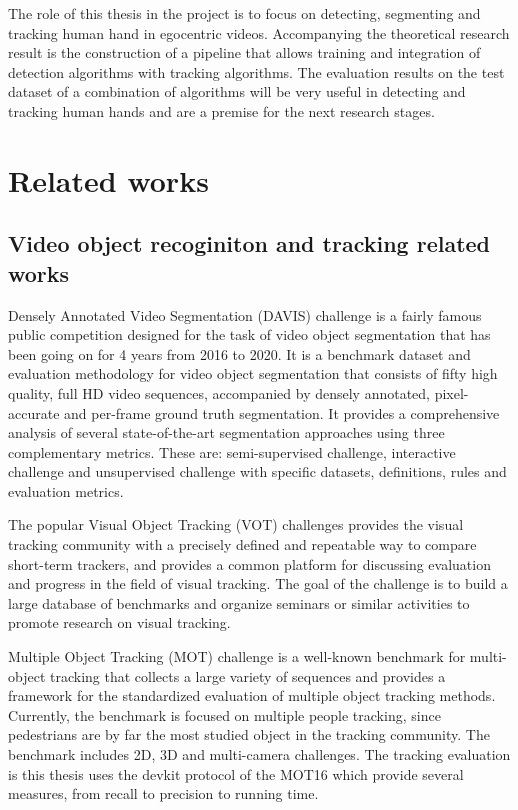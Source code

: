 The role of this thesis in the project is to focus on detecting, segmenting and tracking human hand in egocentric videos. Accompanying the theoretical research result is the construction of a pipeline that allows training and integration of detection algorithms with tracking algorithms. The evaluation results on the test dataset of a combination of algorithms will be very useful in detecting and tracking human hands and are a premise for the next research stages.
\section{Related works}
\subsection{Video object recoginiton and tracking related works}
Densely Annotated Video Segmentation (DAVIS) challenge \cite{7780657} is a fairly famous public competition designed for the task of video object segmentation that has been going on for 4 years from 2016 to 2020. It is a benchmark dataset and evaluation methodology for video object segmentation that consists of fifty high quality, full HD video sequences, accompanied by densely annotated, pixel-accurate and per-frame ground truth segmentation. It provides a comprehensive analysis of several state-of-the-art segmentation approaches using three complementary metrics. These are: semi-supervised challenge, interactive challenge and unsupervised challenge with specific datasets, definitions, rules and evaluation metrics.

The popular Visual Object Tracking (VOT) challenges \cite{VOT_TPAMI} provides the visual tracking community with a precisely defined and repeatable way to compare short-term trackers, and provides a common platform for discussing evaluation and progress in the field of visual tracking. The goal of the challenge is to build a large database of benchmarks and organize seminars or similar activities to promote research on visual tracking.

Multiple Object Tracking (MOT) \cite{DBLP:journals/corr/MilanL0RS16} challenge is a well-known benchmark for multi-object tracking that collects a large variety of sequences and provides a framework for the standardized evaluation of multiple object tracking methods. Currently, the benchmark is focused on multiple people tracking, since pedestrians are by far the most studied object in the tracking community. The benchmark includes 2D, 3D and multi-camera challenges. The tracking evaluation is this thesis uses the devkit protocol of the MOT16 which provide several measures, from recall to precision to running time. 
